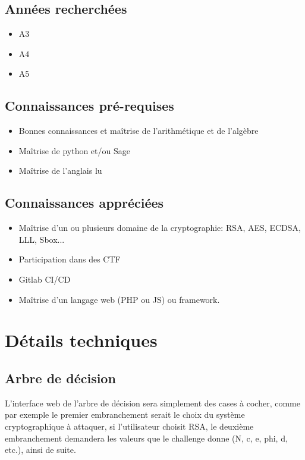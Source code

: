 \documentclass[12pt]{article}
\begin{document}
	\subsection{Années recherchées}
	\begin{itemize}
		\item A3
		\item A4
		\item A5
    \end{itemize}

    \subsection{Connaissances pré-requises}
    \begin{itemize}
        \item Bonnes connaissances et maîtrise de l'arithmétique et de l'algèbre
        \item Maîtrise de python et/ou Sage
        \item Maîtrise de l'anglais lu
    \end{itemize}

	\subsection{Connaissances appréciées}
	\begin{itemize}
		\item Maîtrise d'un ou plusieurs domaine de la cryptographie: RSA, AES, ECDSA, LLL, Sbox...
		\item Participation dans des CTF
		\item Gitlab CI/CD
		\item Maîtrise d'un langage web (PHP ou JS) ou framework.
	\end{itemize}

    \section{Détails techniques}
    \subsection{Arbre de décision}
    L'interface web de l'arbre de décision sera simplement des cases à cocher, comme par exemple le premier embranchement serait le choix du système cryptographique à attaquer, si l'utilisateur choisit RSA, le deuxième embranchement demandera les valeurs que le challenge donne (N, c, e, phi, d, etc.), ainsi de suite.
\end{document}
